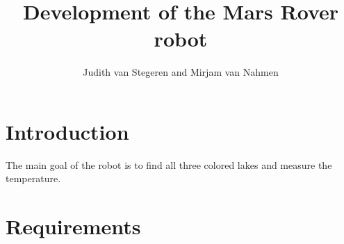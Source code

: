 \documentclass[11pt,a4paper]{article}
\author{Judith van Stegeren and Mirjam van Nahmen}
\title{Development of the Mars Rover robot}
\begin{document}
\maketitle

 
\section{Introduction}
The main goal of the robot is to find all three colored lakes and measure the temperature.

\section{Requirements}
\end{document}
